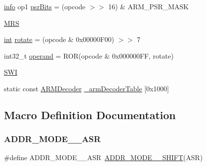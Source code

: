 \begin{DoxyCompactItemize}
\mbox{\hyperlink{libretro_8h_a283ad41e4809f9c0ebe736a9861d8a91}{info}} op1 \mbox{\hyperlink{decoder-arm_8c_a69eccd10e3446c8069693353639ba059}{psr\+Bits}} = (opcode $>$$>$ 16) \& A\+R\+M\+\_\+\+P\+S\+R\+\_\+\+M\+A\+SK
\item 
\mbox{\hyperlink{decoder-arm_8c_a08e2b0a56adcc93949282d6c828080ff}{M\+RS}}
\item 
\mbox{\hyperlink{ioapi_8h_a787fa3cf048117ba7123753c1e74fcd6}{int}} \mbox{\hyperlink{decoder-arm_8c_a0b95db0f87fcbe71c3bbda1fa359606f}{rotate}} = (opcode \& 0x00000\+F00) $>$$>$ 7
\item 
int32\+\_\+t \mbox{\hyperlink{decoder-arm_8c_ab96c60b54bef12d0edc21e03c79be1ac}{operand}} = R\+OR(opcode \& 0x000000\+F\+F, rotate)
\item 
\mbox{\hyperlink{decoder-arm_8c_a7141da859cbdc269afb6e05ab70fd0bc}{S\+WI}}
\item 
static const \mbox{\hyperlink{decoder-arm_8c_ae607effbe3bf4de4aa7445cfb2ba2f67}{A\+R\+M\+Decoder}} \mbox{\hyperlink{decoder-arm_8c_adbb557c0823945188adfe1637ea69499}{\+\_\+arm\+Decoder\+Table}} \mbox{[}0x1000\mbox{]}
\end{DoxyCompactItemize}


\subsection{Macro Definition Documentation}
\mbox{\label{decoder-arm_8c_a0597e090d6870596c4c41dedeb4c0835}} 
\subsubsection{\texorpdfstring{A\+D\+D\+R\+\_\+\+M\+O\+D\+E\+\_\+\_\+\+A\+SR}{ADDR\_MODE\_1\_ASR}}
{\footnotesize\ttfamily \#define A\+D\+D\+R\+\_\+\+M\+O\+D\+E\+\_\+\_\+\+A\+SR~\mbox{\hyperlink{decoder-arm_8c_a1aeb19b9eb90e4741cb384f6d6961224}{A\+D\+D\+R\+\_\+\+M\+O\+D\+E\+\_\+\_\+\+S\+H\+I\+FT}}(A\+SR)}

\mbox{\label{decoder-arm_8c_a2a4a6ca79222326b9ebf7aa606a84c64}} 
